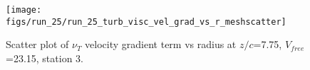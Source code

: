\begin{figure}[H]
\centering
\texttt{[image: figs/run\_25/run\_25\_turb\_visc\_vel\_grad\_vs\_r\_meshscatter]}
\caption{Scatter plot of $\nu_T$ velocity gradient term vs radius at $z/c$=7.75, $V_{free}$=23.15, station 3.}
\label{fig:run_25_turb_visc_vel_grad_vs_r_meshscatter}
\end{figure}


